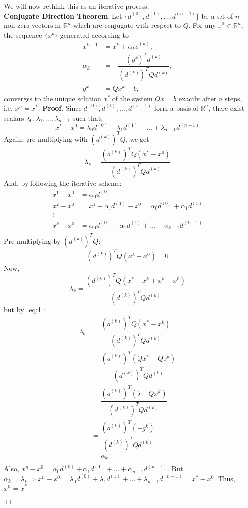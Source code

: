 \documentclass[11pt]{article}
\begin{document}
%
\vskip0.5cm \noindent We will now rethink this as an iterative process:
\\\textbf{Conjugate Direction Theorem}. Let $\{d^{(0)},d^{(1)},\dotsc,d^{(n-1)}\}$
be a set of $n$ non-zero vectors in $\mathbb{R}^n$ which are conjugate with respect
to $Q$. For any $x^0\in\mathbb{R}^n$, the sequence $\{x^k\}$ generated according to
\begin{align*}
    x^{k+1}&=x^k+\alpha_kd^{(k)},\\
    \alpha_k&=-\dfrac{(g^k)^Td^{(k)}}{(d^{(k)})^TQd^{(k)}},\\
    g^k&=Qx^k-b,
\end{align*}
converges to the unique solution $x^*$ of the system $Qx=b$ exactly after $n$ steps,
i.e. $x^n=x^*$.
%
\vskip0.5cm\noindent\textbf{Proof}. Since $d^{(0)},d^{(1)},\dotsc,d^{(n-1)}$ form
a basis of $\mathbb{R}^n$, there exist scalars \(\lambda_0,\lambda_1,\dotsc, \lambda_{n-1}\)
such that:
\[x^*-x^0=\lambda_0d^{(0)}+\lambda_1d^{(1)}+\dotsc+\lambda_{n-1}d^{(n-1)}\]
Again, pre-multiplying with $(d^{(k)})^TQ$, we get
\[\lambda_k=\dfrac{(d^{(k)})^TQ(x^*-x^0)}{(d^{(k)})^TQd^{(k)}}\]
And, by following the iterative scheme:
\begin{align*}
    x^1-x^0&=\alpha_0d^{(0)}\\
    x^2-x^0&=x^1+\alpha_1d^{(1)}-x^0=\alpha_0d^{(0)}+\alpha_1d^{(1)}\\
    \vdots\quad&\\
    x^k-x^0&=\alpha_0d^{(0)}+\alpha_1d^{(1)}+\dotsc+\alpha_{k-1}d^{(k-1)}\\
\end{align*}
Pre-multiplying by $(d^{(k)})^TQ$:
\begin{equation}(d^{(k)})^TQ(x^k-x^0)=0\label{eq:1}\end{equation}
Now,
\[\lambda_k=\dfrac{(d^{(k)})^TQ(x^*-x^k+x^k-x^0)}{(d^{(k)})^TQd^{(k)}}\]
but by~\ref{eq:1}:
\begin{align*}
    \lambda_k&=\dfrac{(d^{(k)})^TQ(x^*-x^k)}{(d^{(k)})^TQd^{(k)}}\\
    &=\dfrac{(d^{(k)})^T(Qx^*-Qx^k)}{(d^{(k)})^TQd^{(k)}}\\
    &=\dfrac{(d^{(k)})^T(b-Qx^k)}{(d^{(k)})^TQd^{(k)}}\\
    &=\dfrac{(d^{(k)})^T(-g^k)}{(d^{(k)})^TQd^{(k)}}\\
    &=\alpha_k\\
\end{align*}
Also, $x^n-x^0=\alpha_0d^{(0)}+\alpha_1d^{(1)}+\dotsc+\alpha_{n-1}d^{(n-1)}$. But
$\alpha_k=\lambda_k\Rightarrow x^n-x^0=\lambda_0d^{(0)}+\lambda_1d^{(1)}+\dotsc+\lambda_{n-1}d^{(n-1)}
= x^*-x^0$. Thus, $x^n=x^*$.
\par\hfill$\Box$
\end{document}
